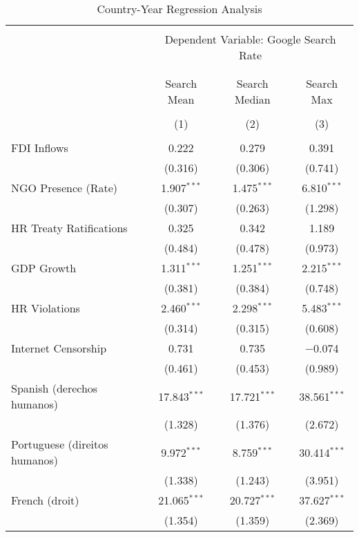 
\begin{table}[!htbp] \centering 
  \caption{Country-Year Regression Analysis} 
  \label{} 
\begin{tabular}{@{\extracolsep{5pt}}lccc} 
\\[-1.8ex]\hline 
\hline \\[-1.8ex] 
 & \multicolumn{3}{c}{Dependent Variable: Google Search Rate} \\ 
\cline{2-4} 
\\[-1.8ex] & \multicolumn{3}{c}{ } \\ 
 & Search Mean & Search Median & Search Max \\ 
\\[-1.8ex] & (1) & (2) & (3)\\ 
\hline \\[-1.8ex] 
 FDI Inflows & 0.222 & 0.279 & 0.391 \\ 
  & (0.316) & (0.306) & (0.741) \\ 
  NGO Presence (Rate) & 1.907$^{***}$ & 1.475$^{***}$ & 6.810$^{***}$ \\ 
  & (0.307) & (0.263) & (1.298) \\ 
  HR Treaty Ratifications & 0.325 & 0.342 & 1.189 \\ 
  & (0.484) & (0.478) & (0.973) \\ 
  GDP Growth & 1.311$^{***}$ & 1.251$^{***}$ & 2.215$^{***}$ \\ 
  & (0.381) & (0.384) & (0.748) \\ 
  HR Violations & 2.460$^{***}$ & 2.298$^{***}$ & 5.483$^{***}$ \\ 
  & (0.314) & (0.315) & (0.608) \\ 
  Internet Censorship & 0.731 & 0.735 & $-$0.074 \\ 
  & (0.461) & (0.453) & (0.989) \\ 
  Spanish (derechos humanos) & 17.843$^{***}$ & 17.721$^{***}$ & 38.561$^{***}$ \\ 
  & (1.328) & (1.376) & (2.672) \\ 
  Portuguese (direitos humanos) & 9.972$^{***}$ & 8.759$^{***}$ & 30.414$^{***}$ \\ 
  & (1.338) & (1.243) & (3.951) \\ 
  French (droit) & 21.065$^{***}$ & 20.727$^{***}$ & 37.627$^{***}$ \\ 
  & (1.354) & (1.359) & (2.369) \\ 

\end{tabular}
\end{table}
